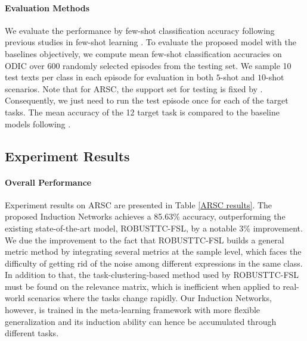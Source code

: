 \documentclass[11pt,a4paper]{article}
\begin{document}
\paragraph{Evaluation Methods} We evaluate the performance by few-shot classification accuracy following previous studies in few-shot learning \citep{snell2017prototypical,sung2018learning}. To evaluate the proposed model with the baselines objectively, we compute mean few-shot classification accuracies on ODIC over 600 randomly selected episodes from the testing set. We sample 10 test texts per class in each episode for evaluation in both $5$-shot and $10$-shot scenarios. Note that for ARSC, the support set for testing is fixed by \citet{yu2018diverse}. Consequently, we just need to run the test episode once for each of the target tasks. The mean accuracy of the 12 target task is compared to the baseline models following \citet{yu2018diverse}.

\subsection{Experiment Results}

\paragraph{Overall Performance} Experiment results on ARSC are presented in Table \ref{ARSC results}. The proposed Induction Networks achieves a 85.63\% accuracy, outperforming the existing state-of-the-art model, ROBUSTTC-FSL, by a notable 3\% improvement. We due the improvement to the fact that ROBUSTTC-FSL builds a general metric method by integrating several metrics at the sample level, which faces the difficulty of getting rid of the noise among different expressions in the same class. In addition to that, the task-clustering-based method used by ROBUSTTC-FSL must be found on the relevance matrix, which is inefficient when applied to real-world scenarios where the tasks change rapidly. Our Induction Networks, however, is trained in the meta-learning framework with more flexible generalization and its induction ability can hence be accumulated through different tasks.
\end{document}
